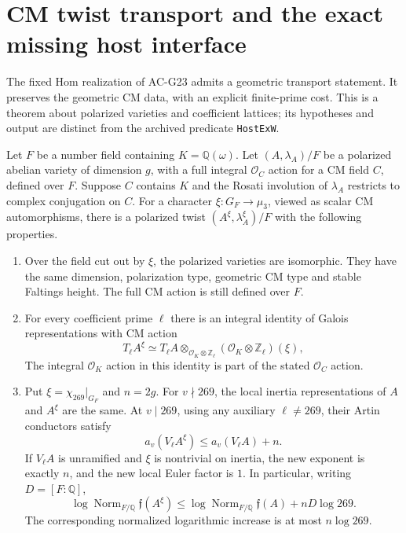 \section{CM twist transport and the exact missing host interface}
\label{sec:cm-twist-transport}

The fixed Hom realization of AC-G23 admits a geometric transport
statement.  It preserves the geometric CM data, with an explicit
finite-prime cost.  This is a theorem about polarized varieties and
coefficient lattices; its hypotheses and output are distinct from
the archived predicate \texttt{HostExW}.

\begin{proposition}
\label{AC-G24}
Let $F$ be a number field containing $K=\mathbb Q(\omega)$.
Let $(A,\lambda_A)/F$ be a polarized abelian variety of dimension
$g$, with a full integral $\mathcal O_C$ action for a CM field $C$,
defined over $F$.
Suppose $C$ contains $K$ and the Rosati involution of $\lambda_A$
restricts to complex conjugation on $C$.
For a character $\xi:G_F\to\mu_3$, viewed as scalar CM
automorphisms, there is a polarized twist
$(A^\xi,\lambda_A^\xi)/F$ with the following properties.
\begin{enumerate}
\item Over the field cut out by $\xi$, the polarized varieties
are isomorphic.  They have the same dimension, polarization type,
geometric CM type and stable Faltings height.  The full CM action
is still defined over $F$.
\item For every coefficient prime $\ell$ there is an integral
identity of Galois representations with CM action
\[
 T_\ell A^\xi\simeq
 T_\ell A\otimes_{\mathcal O_K\otimes\mathbb Z_\ell}
       (\mathcal O_K\otimes\mathbb Z_\ell)(\xi),        \tag{G24.1}
\]
The integral $\mathcal O_K$ action in this identity is part of
the stated $\mathcal O_C$ action.
\item Put $\xi=\chi_{269}|_{G_F}$ and $n=2g$.
For $v\nmid269$, the local inertia representations of $A$ and
$A^\xi$ are the same.  At $v\mid269$, using any auxiliary
$\ell\ne269$, their Artin conductors satisfy
\[
 a_v(V_\ell A^\xi)\leq a_v(V_\ell A)+n.                \tag{G24.2}
\]
If $V_\ell A$ is unramified and $\xi$ is nontrivial on inertia,
the new exponent is exactly $n$, and the new local Euler factor
is $1$.  In particular, writing $D=[F:\mathbb Q]$,
\[
 \log\operatorname{Norm}_{F/\mathbb Q}\mathfrak f(A^\xi)
 \leq\log\operatorname{Norm}_{F/\mathbb Q}\mathfrak f(A)
             +nD\log269.                               \tag{G24.3}
\]
The corresponding normalized logarithmic increase is at most
$n\log269$.
\end{enumerate}


\end{proposition}
